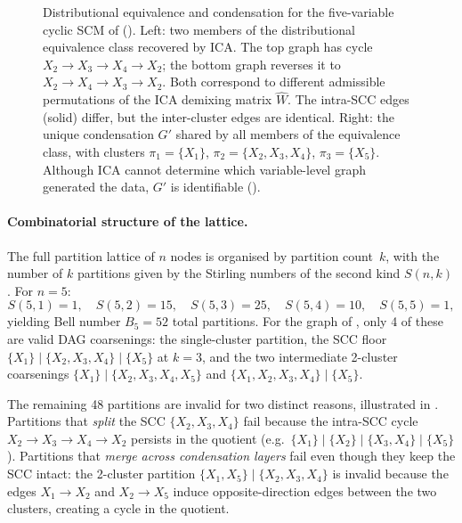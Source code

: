 \documentclass{article}
\begin{document}
\begin{figure}[t]
    \caption{Distributional equivalence and condensation for the five-variable cyclic SCM of \citet{lacerda2008discovering} (). Left: two members of the distributional equivalence class recovered by ICA. The top graph has cycle $X_2 \to X_3 \to X_4 \to X_2$; the bottom graph reverses it to $X_2 \to X_4 \to X_3 \to X_2$. Both correspond to different admissible permutations of the ICA demixing matrix $\hat{W}$. The intra-SCC edges (solid) differ, but the inter-cluster edges are identical. Right: the unique condensation $G'$ shared by all members of the equivalence class, with clusters $\pi_1 = \{X_1\}$, $\pi_2 = \{X_2, X_3, X_4\}$, $\pi_3 = \{X_5\}$. Although ICA cannot determine which variable-level graph generated the data, $G'$ is identifiable ().}
    \label{fig:example}
\end{figure}

\paragraph{Combinatorial structure of the lattice.}
The full partition lattice of $n$ nodes is organised by partition count~$k$, with the number of $k$ partitions given by the Stirling numbers of the second kind $S(n, k)$. For $n = 5$:
\[
    S(5,1) = 1,\quad S(5,2) = 15,\quad S(5,3) = 25,\quad S(5,4) = 10,\quad S(5,5) = 1,
\]
yielding Bell number $B_5 = 52$ total partitions. For the graph of , only 4 of these are valid DAG coarsenings: the single-cluster partition, the SCC floor $\{X_1\}\mid\{X_2,X_3,X_4\}\mid\{X_5\}$ at $k=3$, and the two intermediate 2-cluster coarsenings $\{X_1\}\mid\{X_2,X_3,X_4,X_5\}$ and $\{X_1,X_2,X_3,X_4\}\mid\{X_5\}$.

The remaining 48 partitions are invalid for two distinct reasons, illustrated in . Partitions that \emph{split} the SCC $\{X_2,X_3,X_4\}$ fail because the intra-SCC cycle $X_2\!\to\!X_3\!\to\!X_4\!\to\!X_2$ persists in the quotient (e.g.\ $\{X_1\}\mid\{X_2\}\mid\{X_3,X_4\}\mid\{X_5\}$). Partitions that \emph{merge across condensation layers} fail even though they keep the SCC intact: the 2-cluster partition $\{X_1,X_5\}\mid\{X_2,X_3,X_4\}$ is invalid because the edges $X_1\!\to\!X_2$ and $X_2\!\to\!X_5$ induce opposite-direction edges between the two clusters, creating a cycle in the quotient.
\end{document}
